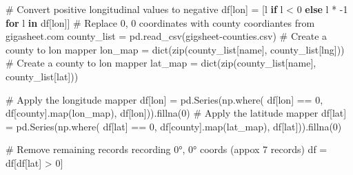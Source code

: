 \documentclass[
]{article}
\newenvironment{Shaded}{\begin{snugshade}}{\end{snugshade}}
\newcommand{\BuiltInTok}[1]{\textcolor[rgb]{0.00,0.23,0.31}{#1}}
\newcommand{\CommentTok}[1]{\textcolor[rgb]{0.37,0.37,0.37}{#1}}
\newcommand{\ControlFlowTok}[1]{\textcolor[rgb]{0.00,0.23,0.31}{\textbf{#1}}}
\newcommand{\DecValTok}[1]{\textcolor[rgb]{0.68,0.00,0.00}{#1}}
\newcommand{\KeywordTok}[1]{\textcolor[rgb]{0.00,0.23,0.31}{\textbf{#1}}}
\newcommand{\NormalTok}[1]{\textcolor[rgb]{0.00,0.23,0.31}{#1}}
\newcommand{\OperatorTok}[1]{\textcolor[rgb]{0.37,0.37,0.37}{#1}}
\newcommand{\StringTok}[1]{\textcolor[rgb]{0.13,0.47,0.30}{#1}}
\begin{document}
\begin{Shaded}
\begin{Highlighting}[]
\CommentTok{\# Convert positive longitudinal values to negative}
\NormalTok{df[}\StringTok{\textquotesingle{}lon\textquotesingle{}}\NormalTok{] }\OperatorTok{=}\NormalTok{ [l }\ControlFlowTok{if}\NormalTok{ l }\OperatorTok{\textless{}} \DecValTok{0} \ControlFlowTok{else}\NormalTok{ l }\OperatorTok{*} \OperatorTok{{-}}\DecValTok{1} \ControlFlowTok{for}\NormalTok{ l }\KeywordTok{in}\NormalTok{ df[}\StringTok{\textquotesingle{}lon\textquotesingle{}}\NormalTok{]]}
\CommentTok{\# Replace 0, 0 coordinates with county coordiantes from gigasheet.com}
\NormalTok{county\_list }\OperatorTok{=}\NormalTok{ pd.read\_csv(}\StringTok{\textquotesingle{}gigsheet{-}counties.csv\textquotesingle{}}\NormalTok{)}
\CommentTok{\# Create a county to lon mapper}
\NormalTok{lon\_map }\OperatorTok{=} \BuiltInTok{dict}\NormalTok{(}\BuiltInTok{zip}\NormalTok{(county\_list[}\StringTok{\textquotesingle{}name\textquotesingle{}}\NormalTok{], county\_list[}\StringTok{\textquotesingle{}lng\textquotesingle{}}\NormalTok{]))}
\CommentTok{\# Create a county to lon mapper}
\NormalTok{lat\_map }\OperatorTok{=} \BuiltInTok{dict}\NormalTok{(}\BuiltInTok{zip}\NormalTok{(county\_list[}\StringTok{\textquotesingle{}name\textquotesingle{}}\NormalTok{], county\_list[}\StringTok{\textquotesingle{}lat\textquotesingle{}}\NormalTok{]))}

\CommentTok{\# Apply the longitude mapper}
\NormalTok{df[}\StringTok{\textquotesingle{}lon\textquotesingle{}}\NormalTok{] }\OperatorTok{=}\NormalTok{ pd.Series(np.where(}
\NormalTok{    df[}\StringTok{\textquotesingle{}lon\textquotesingle{}}\NormalTok{] }\OperatorTok{==} \DecValTok{0}\NormalTok{, df[}\StringTok{\textquotesingle{}county\textquotesingle{}}\NormalTok{].}\BuiltInTok{map}\NormalTok{(lon\_map), df[}\StringTok{\textquotesingle{}lon\textquotesingle{}}\NormalTok{])).fillna(}\DecValTok{0}\NormalTok{)}
\CommentTok{\# Apply the latitude mapper}
\NormalTok{df[}\StringTok{\textquotesingle{}lat\textquotesingle{}}\NormalTok{] }\OperatorTok{=}\NormalTok{ pd.Series(np.where(}
\NormalTok{    df[}\StringTok{\textquotesingle{}lat\textquotesingle{}}\NormalTok{] }\OperatorTok{==} \DecValTok{0}\NormalTok{, df[}\StringTok{\textquotesingle{}county\textquotesingle{}}\NormalTok{].}\BuiltInTok{map}\NormalTok{(lat\_map), df[}\StringTok{\textquotesingle{}lat\textquotesingle{}}\NormalTok{])).fillna(}\DecValTok{0}\NormalTok{)}

\CommentTok{\# Remove remaining records recording 0°, 0° coords (appox 7 records)}
\NormalTok{df }\OperatorTok{=}\NormalTok{ df[df[}\StringTok{\textquotesingle{}lat\textquotesingle{}}\NormalTok{] }\OperatorTok{\textgreater{}} \DecValTok{0}\NormalTok{]}


\end{Highlighting}
\end{Shaded}
\end{document}
